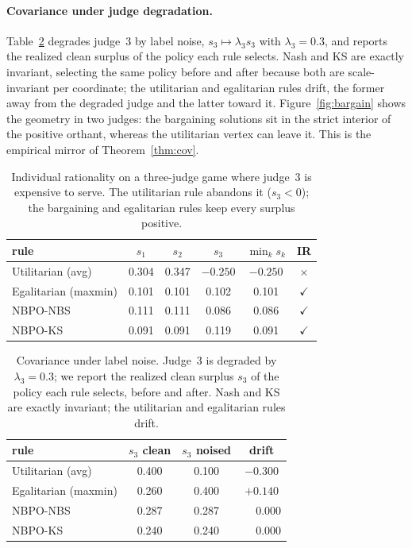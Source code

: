 \documentclass[letterpaper]{article} %
\begin{document}
\paragraph{Covariance under judge degradation.}
Table~\ref{tab:cov} degrades judge~3 by label noise, $s_3\mapsto\lambda_3 s_3$ with $\lambda_3=0.3$, and reports the realized clean surplus of the policy each rule selects. Nash and KS are exactly invariant, selecting the same policy before and after because both are scale-invariant per coordinate; the utilitarian and egalitarian rules drift, the former away from the degraded judge and the latter toward it. Figure~\ref{fig:bargain} shows the geometry in two judges: the bargaining solutions sit in the strict interior of the positive orthant, whereas the utilitarian vertex can leave it. This is the empirical mirror of Theorem~\ref{thm:cov}.

\begin{table}[t]
\centering\footnotesize
\setlength{\tabcolsep}{3.5pt}
\caption{Individual rationality on a three-judge game where judge~3 is expensive to serve. The utilitarian rule abandons it ($s_3<0$); the bargaining and egalitarian rules keep every surplus positive.}
\label{tab:ir}
\begin{tabular}{lccccc}
\toprule
rule & $s_1$ & $s_2$ & $s_3$ & $\min_k s_k$ & IR \\
\midrule
Utilitarian (avg) & 0.304 & 0.347 & $-0.250$ & $-0.250$ & $\times$ \\
Egalitarian (maxmin) & 0.101 & 0.101 & 0.102 & 0.101 & $\checkmark$ \\
NBPO-NBS & 0.111 & 0.111 & 0.086 & 0.086 & $\checkmark$ \\
NBPO-KS & 0.091 & 0.091 & 0.119 & 0.091 & $\checkmark$ \\
\bottomrule
\end{tabular}
\end{table}

\begin{table}[t]
\centering\footnotesize
\caption{Covariance under label noise. Judge~3 is degraded by $\lambda_3=0.3$; we report the realized clean surplus $s_3$ of the policy each rule selects, before and after. Nash and KS are exactly invariant; the utilitarian and egalitarian rules drift.}
\label{tab:cov}
\begin{tabular}{lccc}
\toprule
rule & $s_3$ clean & $s_3$ noised & drift \\
\midrule
Utilitarian (avg) & 0.400 & 0.100 & $-0.300$ \\
Egalitarian (maxmin) & 0.260 & 0.400 & $+0.140$ \\
NBPO-NBS & 0.287 & 0.287 & $\phantom{+}0.000$ \\
NBPO-KS & 0.240 & 0.240 & $\phantom{+}0.000$ \\
\bottomrule
\end{tabular}
\end{table}
\end{document}
